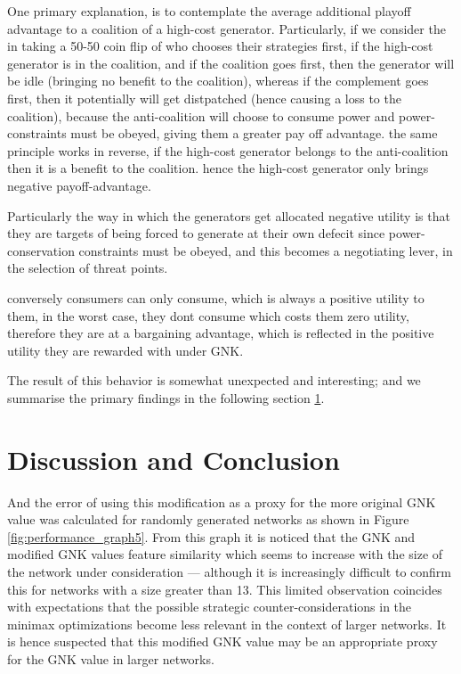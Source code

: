One primary explanation, is to contemplate the average additional playoff advantage to a coalition of a high-cost generator.
Particularly, if we consider the in taking a 50-50 coin flip of who chooses their strategies first, if the high-cost generator is in the coalition, and if the coalition goes first, then the generator will be idle (bringing no benefit to the coalition), whereas if the complement goes first, then it potentially will get distpatched (hence causing a loss to the coalition), because the anti-coalition will choose to consume power and power-constraints must be obeyed, giving them a greater pay off advantage.
the same principle works in reverse, if the high-cost generator belongs to the anti-coalition then it is a benefit to the coalition.
hence the high-cost generator only brings negative payoff-advantage.

Particularly the way in which the generators get allocated negative utility is that they are targets of being forced to generate at their own defecit since power-conservation constraints must be obeyed, and this becomes a negotiating lever, in the selection of threat points.

conversely consumers can only consume, which is always a positive utility to them, in the worst case, they dont consume which costs them zero utility, therefore they are at a bargaining advantage, which is reflected in the positive utility they are rewarded with under GNK.

The result of this behavior is somewhat unexpected and interesting; and we summarise the primary findings in the following section \ref{sec:GNK_value_discussion}.





\section{Discussion and Conclusion}\label{sec:GNK_value_discussion}




And the error of using this modification as a proxy for the more original GNK value was calculated for randomly generated networks as shown in Figure \ref{fig:performance_graph5}.
From this graph it is noticed that the GNK and modified GNK values feature similarity which seems to increase with the size of the network under consideration --- although it is increasingly difficult to confirm this for networks with a size greater than 13.
This limited observation coincides with expectations that the possible strategic counter-considerations in the minimax optimizations become less relevant in the context of larger networks.
It is hence suspected that this modified GNK value may be an appropriate proxy for the GNK value in larger networks.

